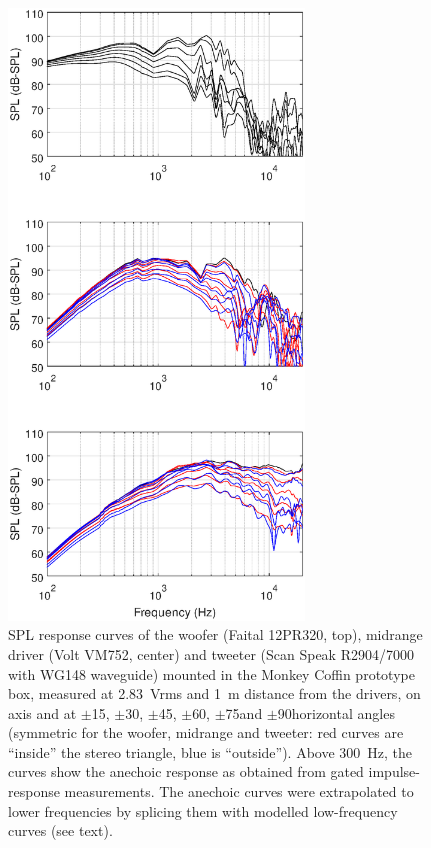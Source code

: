 \documentclass[12pt,a4paper]{article}
\providecommand{\figlabel}[1]{\label{fig:#1}}
\begin{document}
\begin{figure}[p]
	\centering
	\vspace{-10ex}
	\includegraphics[width=0.7\textwidth]{SPL_curves_raw.eps}
	\caption{SPL response curves of the woofer (Faital 12PR320, top), midrange driver (Volt VM752, center) and tweeter (Scan Speak R2904/7000 with WG148 wave\-guide) mounted in the Monkey Coffin prototype box, measured at \SI{2.83}{Vrms} and \SI{1}{m} distance from the drivers, on axis and at $\pm$15\degree, $\pm$30\degree, $\pm$45\degree, $\pm$60\degree, $\pm$75\degree and $\pm$90\degree horizontal angles (symmetric for the woofer, midrange and tweeter: red curves are ``inside'' the stereo triangle, blue is ``outside''). Above \SI{300}{Hz}, the curves show the anechoic response as obtained from gated impulse-response measurements. The anechoic curves were extrapolated to lower frequencies by splicing them with modelled low-frequency curves (see text).}
	\figlabel{SPL_curves_raw}
\end{figure}
\end{document}
